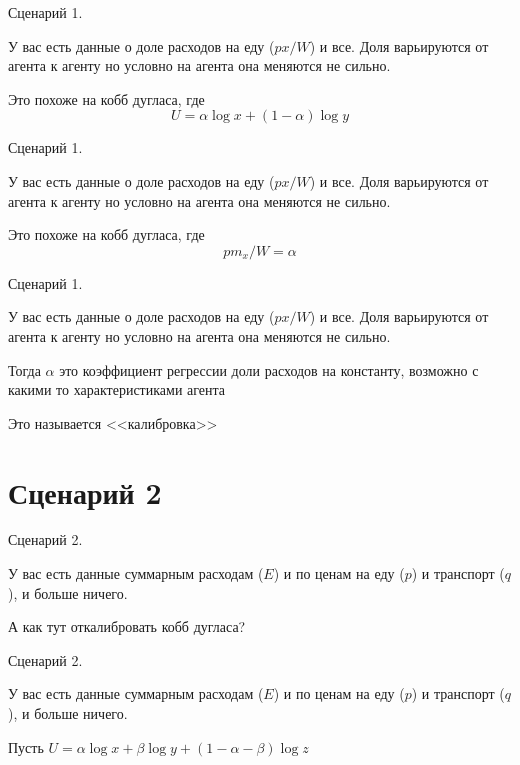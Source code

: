 \documentclass{beamer}
\begin{document}
\begin{frame}{Сценарий 1.}

У вас есть данные о доле расходов на еду ($p x/W$) и все. Доля варьируются от агента к агенту но условно на агента она меняются не сильно.

Это похоже на кобб дугласа, где $$U = \alpha \log x + (1-\alpha) \log y$$

\end{frame}

\begin{frame}{Сценарий 1.}

У вас есть данные о доле расходов на еду ($p x/W$) и все. Доля варьируются от агента к агенту но условно на агента она меняются не сильно.

Это похоже на кобб дугласа, где $$p m_x/W = \alpha$$

\end{frame}

\begin{frame}{Сценарий 1.}

У вас есть данные о доле расходов на еду ($p x/W$) и все. Доля варьируются от агента к агенту но условно на агента она меняются не сильно.

Тогда $\alpha$ это коэффициент регрессии доли расходов на константу, возможно с какими то характеристиками агента

Это называется <<калибровка>>

\end{frame}

\section{Сценарий 2}

\begin{frame}{Сценарий 2.}

У вас есть данные суммарным расходам ($E$) и по ценам на еду ($p$) и транспорт ($q$), и больше ничего.

А как тут откалибровать кобб дугласа?

\end{frame}

\begin{frame}{Сценарий 2.}

У вас есть данные суммарным расходам ($E$) и по ценам на еду ($p$) и транспорт ($q$), и больше ничего.

Пусть $U = \alpha \log x + \beta \log y + (1-\alpha-\beta) \log z$

\end{frame}
\end{document}
